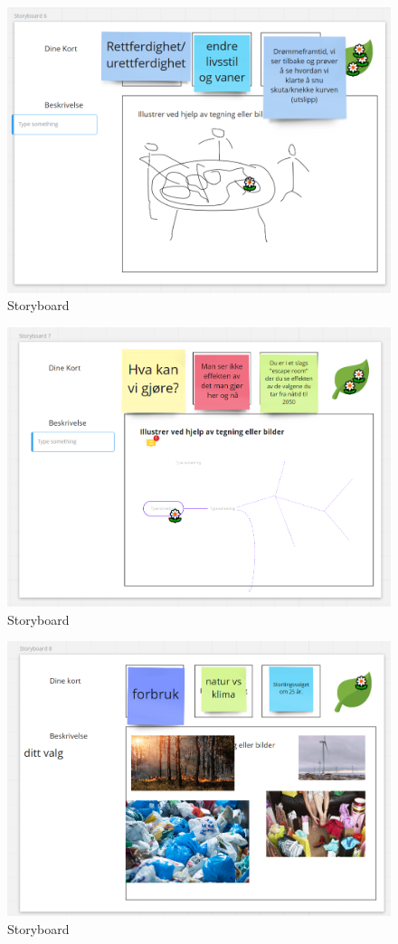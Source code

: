 \begin{figure}[H]
    \centering 
    \includegraphics[width=12.5cm]{pictures/appendix/narrative/s6.PNG}
    \caption{Storyboard}
\end{figure}

\begin{figure}[H]
    \centering 
    \includegraphics[width=12.5cm]{pictures/appendix/narrative/s7.PNG}
    \caption{Storyboard}
\end{figure}

\begin{figure}[H]
    \centering 
    \includegraphics[width=12.5cm]{pictures/appendix/narrative/s8.PNG}
    \caption{Storyboard}
\end{figure}

